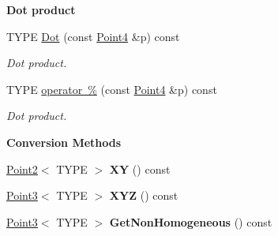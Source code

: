 \begin{Indent}\textbf{ Dot product}\par
\begin{DoxyCompactItemize}
\item 
\mbox{\label{classcy_1_1_point4_a2cdbb44bed05babf6947d4aa498a51f0}} 
T\+Y\+PE \mbox{\hyperlink{classcy_1_1_point4_a2cdbb44bed05babf6947d4aa498a51f0}{Dot}} (const \mbox{\hyperlink{classcy_1_1_point4}{Point4}} \&p) const
\begin{DoxyCompactList}\small\item\em Dot product. \end{DoxyCompactList}\item 
\mbox{\label{classcy_1_1_point4_a6df61c3138fd261c21512a75b3d22492}} 
T\+Y\+PE \mbox{\hyperlink{classcy_1_1_point4_a6df61c3138fd261c21512a75b3d22492}{operator \%}} (const \mbox{\hyperlink{classcy_1_1_point4}{Point4}} \&p) const
\begin{DoxyCompactList}\small\item\em Dot product. \end{DoxyCompactList}\end{DoxyCompactItemize}
\end{Indent}
\begin{Indent}\textbf{ Conversion Methods}\par
\begin{DoxyCompactItemize}
\item 
\mbox{\label{classcy_1_1_point4_a003efb69cebb245df63471a04a138ae5}} 
\mbox{\hyperlink{classcy_1_1_point2}{Point2}}$<$ T\+Y\+PE $>$ {\bfseries XY} () const
\item 
\mbox{\label{classcy_1_1_point4_aa421cad025d724d1878e2f1de3eae395}} 
\mbox{\hyperlink{classcy_1_1_point3}{Point3}}$<$ T\+Y\+PE $>$ {\bfseries X\+YZ} () const
\item 
\mbox{\label{classcy_1_1_point4_aca74d4e6dbdce9adbcc4fb23ddf4cc13}} 
\mbox{\hyperlink{classcy_1_1_point3}{Point3}}$<$ T\+Y\+PE $>$ {\bfseries Get\+Non\+Homogeneous} () const
\end{DoxyCompactItemize}
\end{Indent}
